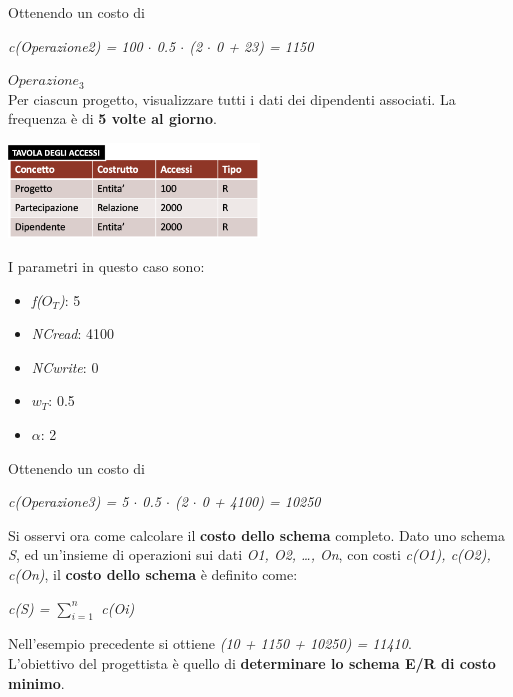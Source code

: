 \documentclass{article}
\begin{document}
Ottenendo un costo di
\begin{center}
    \textit{c(Operazione2) = 100 $\cdot$ 0.5 $\cdot$ (2 $\cdot$ 0 + 23) = 1150}\vspace{14pt}\\
\end{center}
\textit{$Operazione_3$}\\
Per ciascun progetto, visualizzare tutti i dati dei dipendenti associati. La frequenza è di \textbf{5 volte al giorno}.
\begin{center}
    \includegraphics[width=0.5\textwidth]{foto 14.png}
\end{center}
I parametri in questo caso sono:
\begin{itemize}[label={ }, leftmargin=1cm]
    \item \textit{f($O_T$)}: 5
    \item \textit{NCread}: 4100
    \item \textit{NCwrite}: 0
    \item \textit{$w_T$}: 0.5
    \item \textit{$\alpha$}: 2
\end{itemize}
Ottenendo un costo di
\begin{center}
    \textit{c(Operazione3) = 5 $\cdot$ 0.5 $\cdot$ (2 $\cdot$ 0 + 4100) = 10250}\vspace{14pt}\\
\end{center}
Si osservi ora come calcolare il \textbf{costo dello schema} completo. Dato uno schema \textit{S}, ed un'insieme di operazioni sui dati \textit{O1, O2, \dots, On}, con costi \textit{c(O1), c(O2), c(On)}, il \textbf{costo dello schema} è definito come:\\
\begin{center}
    \textit{c(S) = $\sum_{i = 1}^{n}$ c(Oi)}\vspace{14pt}\\
\end{center}
Nell'esempio precedente si ottiene \textit{(10 + 1150 + 10250) = 11410}.\vspace*{14pt}\\
L'obiettivo del progettista è quello di \textbf{determinare lo schema E/R di costo minimo}.\\
\end{document}
